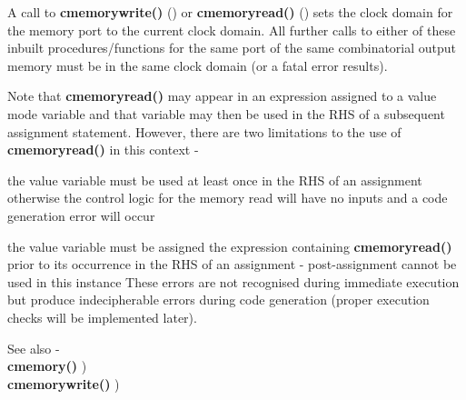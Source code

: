         A call to {\bf cmemorywrite()} () or {\bf cmemoryread()}
        () sets the clock domain for the memory port to the
        current clock domain. All further calls to either of these inbuilt
        procedures/functions for the same port of the same combinatorial output
        memory must be in the same clock domain (or a fatal error results).
            
        Note that {\bf cmemoryread()} may appear in an expression assigned
        to a value mode variable and that variable may then be used in the
        RHS of a subsequent assignment statement. However, there are two limitations
        to the use of {\bf cmemoryread()} in this context -
        \blist
        \item   the value variable must be used at least once in the RHS of
                an assignment otherwise the control logic for the memory
                read will have no inputs and a code generation error
                will occur
        \item   the value variable must be assigned the expression
                containing {\bf cmemoryread()} prior to its occurrence
                in the RHS of an assignment - post-assignment cannot
                be used in this instance
        \blend
        These errors are not recognised during immediate execution but
        produce indecipherable errors during code generation
        (proper execution checks will be implemented later).
        
        See also - \\
        {\bf cmemory()} ) \\
        {\bf cmemorywrite()} ) \\




